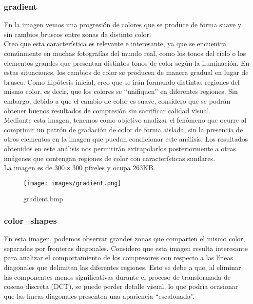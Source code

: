 \documentclass[12pt,a4paper]{article}
\begin{document}
\break
\subsubsection{gradient}
En la imagen vemos una progresión de colores que se produce de forma suave y sin cambios bruscos entre zonas de distinto color.\\

Creo que esta característica es relevante e interesante, ya que se encuentra comúnmente en muchas fotografías del mundo real, como los tonos del cielo o los elementos grandes que presentan distintos tonos de color según la iluminación. En estas situaciones, los cambios de color se producen de manera gradual en lugar de brusca. Como hipótesis inicial, creo que se irán formando distintas regiones del mismo color, es decir, que los colores se ``unifiquen'' en diferentes regiones. Sin embargo, debido a que el cambio de color es suave, considero que se podrán obtener buenos resultados de compresión sin sacrificar calidad visual.\\ 

Mediante esta imagen, tenemos como objetivo analizar el fenómeno que ocurre al comprimir un patrón de gradación de color de forma aislada, sin la presencia de otros elementos en la imagen que puedan condicionar este análisis. Los resultados obtenidos en este análisis nos permitirán extrapolarlos posteriormente a otras imágenes que contengan regiones de color con características similares.\\

La imagen es de $300\times300$ píxeles y ocupa 263KB.\\

\begin{figure}[H]
    \centering
    \texttt{[image: images/gradient.png]}
    \caption{gradient.bmp}
    
\end{figure}

\break
\subsubsection{color\_shapes}
En esta imagen, podemos observar grandes zonas que comparten el mismo color, separadas por fronteras diagonales. Considero que esta imagen resulta interesante para analizar el comportamiento de los compresores con respecto a las líneas diagonales que delimitan las diferentes regiones. Esto se debe a que, al eliminar las componentes menos significativas durante el proceso de transformada de coseno discreta (DCT), se puede perder detalle visual, lo que podría ocasionar que las líneas diagonales presenten una apariencia ``escalonada''.\\
\end{document}
